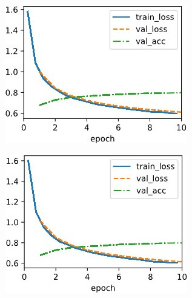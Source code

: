 \documentclass{article}
\begin{document}
\begin{figure}[ht]
\begin{center}
\begin{subfigure}[b]{0.3\columnwidth}
   \includegraphics[width=\columnwidth]{img/lr0.01 cosine0.1.jpg}
\end{subfigure}
\hfill
\begin{subfigure}[b]{0.3\columnwidth}\centering
   \includegraphics[width=\columnwidth]{img/lr0.01 cosine0.05.jpg}
\end{subfigure}
\hfill
\begin{subfigure}[b]{0.3\columnwidth}\centering

\end{subfigure}
\end{center}
\end{figure}
\end{document}
